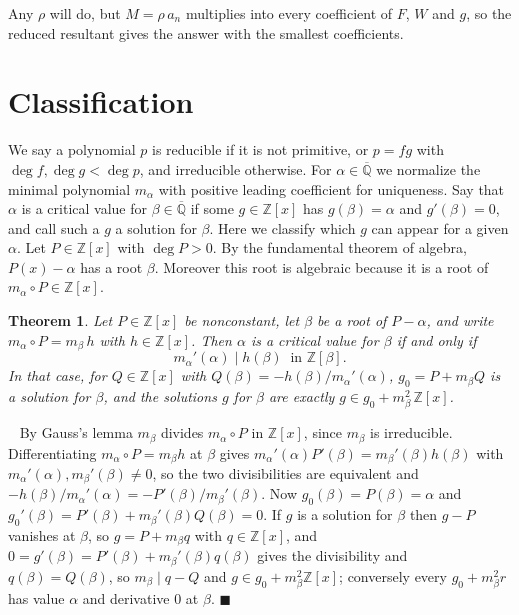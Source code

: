 \documentclass[10pt]{article}
\newcommand\Z{\mathbb{Z}}
\newcommand\Q{\mathbb{Q}}
\theoremstyle{plain}
\newtheorem{theorem}{Theorem}
\theoremstyle{remark}
\theoremstyle{plain}
\newenvironment{pf}{%
  \par\addvspace{\medskipamount}\noindent\uwave{pf.}\ \ignorespaces}{%
  \unskip\nobreak\hfill$\blacksquare$\par\addvspace{\medskipamount}}
\begin{document}
Any $\rho$ will do, but $M = \rho\,a_{n}$ multiplies into every coefficient of
$F$, $W$ and $g$, so the reduced resultant gives the answer with the smallest
coefficients.

\section{Classification}\label{Sclass}

We say a polynomial $p$ is reducible if it is not primitive, or $p = fg$
with $\deg f, \deg g < \deg p$, and irreducible otherwise. For
$\alpha \in \overline{\Q}$ we normalize the minimal polynomial $m_{\alpha}$
with positive leading coefficient for uniqueness.
Say that $\alpha$ is a critical value for $\beta \in \overline{\Q}$ if some
$g \in \Z[x]$ has $g(\beta) = \alpha$ and $g'(\beta) = 0$, and call such a $g$
a solution for $\beta$. Here we classify which $g$ can appear for a given
$\alpha$. Let $P \in \Z[x]$ with $\deg P > 0$. By the fundamental theorem
of algebra, $P(x) - \alpha$ has a root $\beta$. Moreover this root is
algebraic because it is a root of $m_{\alpha} \circ P \in \Z[x]$.

\begin{theorem}\label{Tcoset}
  Let $P \in \Z[x]$ be nonconstant, let $\beta$ be a root of $P - \alpha$,
  and write $m_{\alpha} \circ P = m_{\beta}\,h$ with $h \in \Z[x]$. Then
  $\alpha$ is a critical value for $\beta$ if and only if
  \[
    m_{\alpha}'(\alpha) \mid h(\beta) \ \text{ in } \Z[\beta] .
  \]
  In that case,
  for $Q \in \Z[x]$ with $Q(\beta) = -h(\beta)/m_{\alpha}'(\alpha)$,
  $g_{0} = P + m_{\beta}Q$ is a solution for $\beta$, and the solutions $g$
  for $\beta$ are exactly $g \in g_{0} + m_{\beta}^{2}\,\Z[x]$.
\end{theorem}

\begin{pf}
  By Gauss's lemma $m_{\beta}$ divides $m_{\alpha} \circ P$ in $\Z[x]$, since
  $m_{\beta}$ is irreducible. Differentiating $m_{\alpha} \circ P = m_{\beta}h$
  at $\beta$ gives $m_{\alpha}'(\alpha)P'(\beta) = m_{\beta}'(\beta)h(\beta)$
  with $m_{\alpha}'(\alpha), m_{\beta}'(\beta) \neq 0$, so the two
  divisibilities are equivalent and
  $-h(\beta)/m_{\alpha}'(\alpha) = -P'(\beta)/m_{\beta}'(\beta)$. Now
  $g_{0}(\beta) = P(\beta) = \alpha$ and
  $g_{0}'(\beta) = P'(\beta) + m_{\beta}'(\beta)Q(\beta) = 0$. If $g$ is a
  solution for $\beta$ then $g - P$ vanishes at $\beta$, so
  $g = P + m_{\beta}q$ with $q \in \Z[x]$, and
  $0 = g'(\beta) = P'(\beta) + m_{\beta}'(\beta)q(\beta)$ gives the
  divisibility and $q(\beta) = Q(\beta)$, so $m_{\beta} \mid q - Q$ and
  $g \in g_{0} + m_{\beta}^{2}\Z[x]$; conversely every $g_{0} + m_{\beta}^{2}r$
  has value $\alpha$ and derivative $0$ at $\beta$.
\end{pf}
\end{document}
